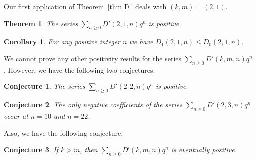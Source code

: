 \documentclass[reqno]{amsart}
\theoremstyle{definition}
\theoremstyle{plain}
\newtheorem{theorem}    {Theorem}
\newtheorem{corollary}  {Corollary}
\newtheorem{conjecture} {Conjecture}
\theoremstyle{remark}
\numberwithin{equation}{section}
\newcommand{\fr}{\frac}
\begin{document}
%
Our first application of Theorem~\ref{thm D'} deals with $(k,m)=(2,1)$.
%
\begin{theorem}\label{thm positiveD21}
The series $\textstyle \sum_{n\geq 0} D'(2,1,n)q^n$ is positive.
\end{theorem}
%
%
\begin{corollary}\label{cor ineqD21}
For any positive integer $n$ we have $D_1(2,1,n) \leq D_0(2,1,n)$.
\end{corollary}
%
We cannot prove any other positivity results for the series $\textstyle \sum_{n\geq 0} D'(k,m,n)q^n$ . However, we have the following
two conjectures.%
\begin{conjecture}\label{conj positiveD22}
The series $\textstyle \sum_{n\geq 0}D'(2,2,n)q^n$ is positive.
\end{conjecture}
\begin{conjecture}\label{conj positiveD23}
The only negative coefficients of the series $\textstyle \sum_{n\geq 0}D'(2,3,n)q^n$ occur at $n=10$ and $n=22$.
\end{conjecture}
Also, we have the following conjecture.
\begin{conjecture}\label{conj positiveDkm}
If $k > m$, then $\textstyle \sum_{n\geq 0}D'(k,m,n)q^n$ is eventually positive.
\end{conjecture}
%
\end{document}
